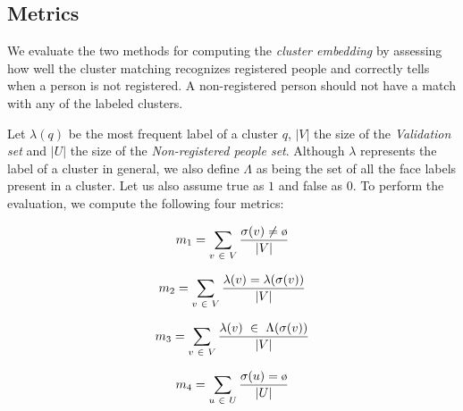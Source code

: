 \subsection{Metrics}

We evaluate the two methods for computing the \emph{cluster embedding} by assessing how well the cluster matching recognizes registered people and correctly tells when a person is not registered.
A non-registered person should not have a match with any of the labeled clusters.

Let $\lambda(q)$ be the most frequent label of a cluster $q$, $|V|$ the size of the \emph{Validation set} and $|U|$ the size of the \emph{Non-registered people set}.
Although $\lambda$ represents the label of a cluster in general, we also define $\Lambda$ as being the set of all the face labels present in a cluster.
Let us also assume true as $1$ and false as $0$.
To perform the evaluation, we compute the following four metrics:

\vspace{2em}
\noindent\begin{minipage}[c]{0.45\linewidth}
    \begin{equation}
    \small
    m_1 = \sum_{v~\in~V}{\frac{\sigma(v)\ne\text{\o}}{|V|}}
    \end{equation}
\end{minipage}
\hfill
\begin{minipage}[c]{0.45\linewidth}
    \begin{equation}
    \small
    m_2 = \sum_{v~\in~V}{\frac{\lambda(v) = \lambda(\sigma(v))}{|V|}}    
    \end{equation}
\end{minipage}

\vspace{1em}

\noindent\begin{minipage}[c]{0.45\linewidth}
    \begin{equation}
    \small
    m_3 = \sum_{v~\in~V}{\frac{\lambda(v)~\in~\Lambda(\sigma(v))}{|V|}} 
    \end{equation}
\end{minipage}
\hfill
\begin{minipage}[c]{0.45\linewidth}
    \begin{equation}
    \small
    m_4 = \sum_{u~\in~U}{\frac{\sigma(u)=\text{\o}}{|U|}}
    \end{equation}
\end{minipage}
\vspace{2em}

